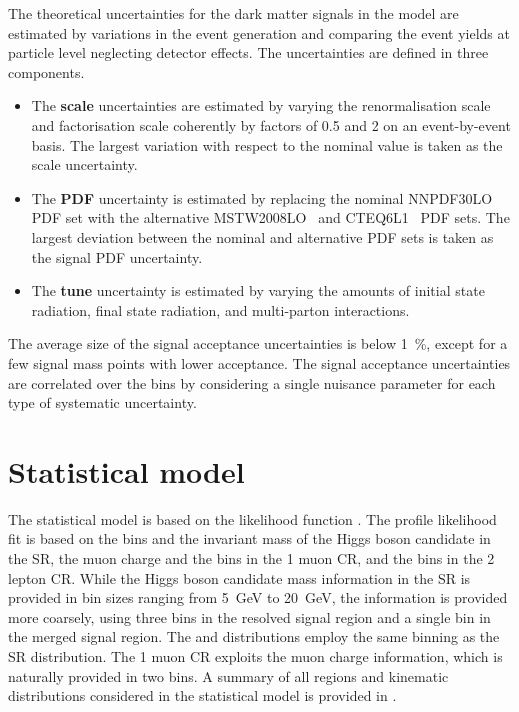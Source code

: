 The theoretical uncertainties for the dark matter signals in the \zhdm model are estimated by variations in the event generation and comparing the event yields at particle level neglecting detector effects. The uncertainties are defined in three components.
\begin{itemize}
  \item The \textbf{scale} uncertainties are estimated by varying the renormalisation scale \muR and factorisation scale \muF coherently by factors of \num{0.5} and \num{2} on an event-by-event basis. The largest variation with respect to the nominal value is taken as the scale uncertainty.
  \item The \textbf{PDF} uncertainty is estimated by replacing the nominal \textsc{NNPDF30LO} PDF set with the alternative \textsc{MSTW2008LO}~\cite{Martin2009} and \textsc{CTEQ6L1}~\cite{Pumplin:2002vw} PDF sets. The largest deviation between the nominal and alternative PDF sets is taken as the signal PDF uncertainty.
  \item The \textbf{tune} uncertainty is estimated by varying the amounts of initial state radiation, final state radiation, and multi-parton interactions.
\end{itemize}
The average size of the signal acceptance uncertainties is below \SI{1}{\percent}, except for a few signal mass points with lower acceptance.
The signal acceptance uncertainties are correlated over the \met bins by considering a single nuisance parameter for each type of systematic uncertainty.


\section{Statistical model}
\label{sec:monoH:model}
The statistical model is based on the likelihood function . The profile likelihood fit is based on the \met bins and the invariant mass of the Higgs boson candidate in the SR, the muon charge and the \metnomu bins in the 1 muon CR, and the \ptll bins in the  2 lepton CR.
While the Higgs boson candidate mass information in the SR is provided in bin sizes ranging from \SI{5}{\giga\electronvolt} to \SI{20}{\giga\electronvolt}, the \met information is provided more coarsely, using three bins in the resolved signal region and a single bin in the merged signal region. The \metnomu and \ptll distributions employ the same binning as the SR \met distribution. The 1 muon CR exploits the muon charge information, which is naturally provided in two bins.
A summary of all regions and kinematic distributions considered in the statistical model is provided in .

